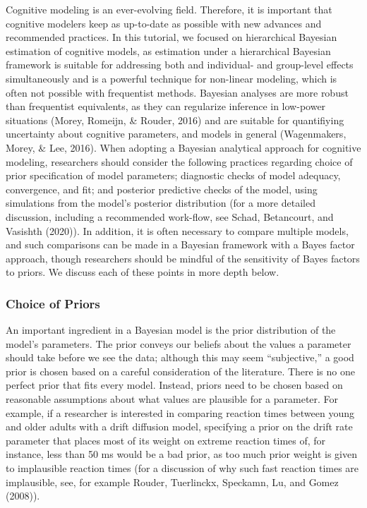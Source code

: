 \documentclass[
  english,
  ,man,floatsintext]{apa6}
\begin{document}
Cognitive modeling is an ever-evolving field. Therefore, it is important that cognitive modelers keep as up-to-date as possible with new advances and recommended practices. In this tutorial, we focused on hierarchical Bayesian estimation of cognitive models, as estimation under a hierarchical Bayesian framework is suitable for addressing both and individual- and group-level effects simultaneously and is a powerful technique for non-linear modeling, which is often not possible with frequentist methods. Bayesian analyses are more robust than frequentist equivalents, as they can regularize inference in low-power situations (Morey, Romeijn, \& Rouder, 2016) and are suitable for quantifiying uncertainty about cognitive parameters, and models in general (Wagenmakers, Morey, \& Lee, 2016). When adopting a Bayesian analytical approach for cognitive modeling, researchers should consider the following practices regarding choice of prior specification of model parameters; diagnostic checks of model adequacy, convergence, and fit; and posterior predictive checks of the model, using simulations from the model's posterior distribution (for a more detailed discussion, including a recommended work-flow, see Schad, Betancourt, and Vasishth (2020)). In addition, it is often necessary to compare multiple models, and such comparisons can be made in a Bayesian framework with a Bayes factor approach, though researchers should be mindful of the sensitivity of Bayes factors to priors. We discuss each of these points in more depth below.

\hypertarget{choice-of-priors}{%
\subsubsection{Choice of Priors}\label{choice-of-priors}}

An important ingredient in a Bayesian model is the prior distribution of the model's parameters. The prior conveys our beliefs about the values a parameter should take before we see the data; although this may seem \enquote{subjective,} a good prior is chosen based on a careful consideration of the literature. There is no one perfect prior that fits every model. Instead, priors need to be chosen based on reasonable assumptions about what values are plausible for a parameter. For example, if a researcher is interested in comparing reaction times between young and older adults with a drift diffusion model, specifying a prior on the drift rate parameter that places most of its weight on extreme reaction times of, for instance, less than 50 ms would be a bad prior, as too much prior weight is given to implausible reaction times (for a discussion of why such fast reaction times are implausible, see, for example Rouder, Tuerlinckx, Speckamn, Lu, and Gomez (2008)).
\end{document}
